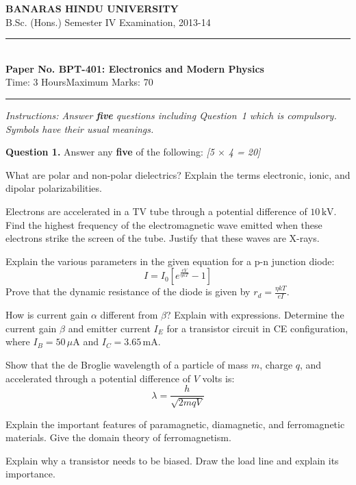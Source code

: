 \documentclass[11pt,a4paper]{article}
\newcommand{\pts}[1]{\hfill   \textit{[#1]}}
\begin{document}
\begin{center}
  {\large\bfseries BANARAS HINDU UNIVERSITY}\\[2pt]
  {\normalsize B.Sc. (Hons.) Semester IV Examination, 2013-14}\\[6pt]
  \rule{0.8\linewidth}{0.5pt}\\[6pt]
  {\large\bfseries Paper No. BPT-401: Electronics and Modern Physics}\\[4pt]
  {\normalsize Time: 3 Hours\hfill Maximum Marks: 70}
\end{center}
\rule{\linewidth}{0.4pt}
\smallskip



\noindent   \textit{Instructions: Answer   \textbf{five} questions including Question~1 which is compulsory. Symbols have their usual meanings.}
\bigskip




\noindent   \textbf{Question 1.} Answer any   \textbf{five} of the following: \pts{5 $ \times$ 4 = 20}

\begin{parts}
  \item What are polar and non-polar dielectrics? Explain the terms electronic, ionic, and dipolar polarizabilities.
  \item Electrons are accelerated in a TV tube through a potential difference of $10\, \text{kV}$. Find the highest frequency of the electromagnetic wave emitted when these electrons strike the screen of the tube. Justify that these waves are X-rays.
  \item Explain the various parameters in the given equation for a p-n junction diode:
    \[ I = I_0 \left[ e^{\frac{eV}{\eta k T}} - 1 \right] \]
    Prove that the dynamic resistance of the diode is given by $r_d = \frac{\eta k T}{e I}$.
  \item How is current gain $\alpha$ different from $\beta$? Explain with expressions. Determine the current gain $\beta$ and emitter current $I_E$ for a transistor circuit in CE configuration, where $I_B = 50\,\mu \text{A}$ and $I_C = 3.65\, \text{mA}$.
  \item Show that the de Broglie wavelength of a particle of mass $m$, charge $q$, and accelerated through a potential difference of $V$ volts is:
    \[ \lambda = \frac{h}{\sqrt{2mqV}} \]
  \item Explain the important features of paramagnetic, diamagnetic, and ferromagnetic materials. Give the domain theory of ferromagnetism.
  \item Explain why a transistor needs to be biased. Draw the load line and explain its importance.
\end{parts}
\end{document}
